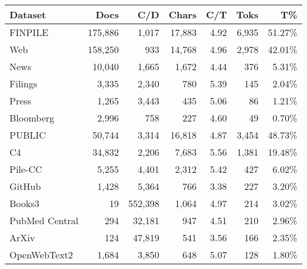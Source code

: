 \begin{table}[!h]
	\centering
	\begin{tabularx}{\textwidth}{lrrrrrr}
		\toprule
		\textbf{Dataset}    & \textbf{Docs}    & \textbf{C/D}   & \textbf{Chars}  & \textbf{C/T}  & \textbf{Toks}  & \textbf{T\%}      \\
		\midrule
		FINPILE             & 175,886          & 1,017          & 17,883          & 4.92          & 6,935          & 51.27\%           \\
		Web                 & 158,250          & 933            & 14,768          & 4.96          & 2,978          & 42.01\%           \\
		News                & 10,040           & 1,665          & 1,672           & 4.44          & 376            & 5.31\%            \\
		Filings             & 3,335            & 2,340          & 780             & 5.39          & 145            & 2.04\%            \\
		Press               & 1,265            & 3,443          & 435             & 5.06          & 86             & 1.21\%            \\
		Bloomberg           & 2,996            & 758            & 227             & 4.60          & 49             & 0.70\%            \\
		PUBLIC              & 50,744           & 3,314          & 16,818          & 4.87          & 3,454          & 48.73\%           \\
		C4                  & 34,832           & 2,206          & 7,683           & 5.56          & 1,381          & 19.48\%           \\
		Pile-CC             & 5,255            & 4,401          & 2,312           & 5.42          & 427            & 6.02\%            \\
		GitHub              & 1,428            & 5,364          & 766             & 3.38          & 227            & 3.20\%            \\
		Books3              & 19               & 552,398        & 1,064           & 4.97          & 214            & 3.02\%            \\
		PubMed Central      & 294              & 32,181         & 947             & 4.51          & 210            & 2.96\%            \\
		ArXiv               & 124              & 47,819         & 541             & 3.56          & 166            & 2.35\%            \\
		OpenWebText2        & 1,684            & 3,850          & 648             & 5.07          & 128            & 1.80\%            \\

\end{tabularx}
\end{table}
